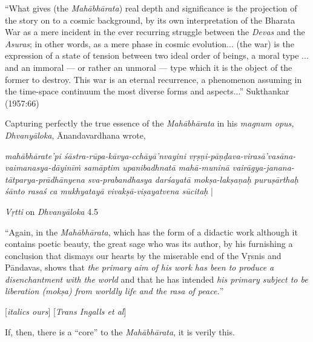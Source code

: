 \begin{myquote}
“What gives (the {\sl Mahābhārata}) real depth and significance is the projection of the story on to a cosmic background, by its own interpretation of the Bharata War as a mere incident in the ever recurring struggle between the {\sl Devas} and the {\sl Asuras}; in other words, as a mere phase in cosmic evolution... (the war) is the expression of a state of tension between two ideal order of beings, a moral type ...  and an immoral --- or rather an unmoral --- type which it is the object of the former to destroy. This war is an eternal recurrence, a phenomenon assuming in the time-space continuum the most diverse forms and aspects...” 
\hfill Sukthankar (1957:66)
\end{myquote}

Capturing perfectly the true essence of the {\sl Mahābhārata} in his {\sl magnum opus, Dhvanyāloka}, Ānandavardhana wrote, 

\begin{myquote}
{{\sl mahābhārate'pi śāstra-rūpa-kāvya-cchāyā’nvayini vṛṣṇi-pāṇḍava-virasā’vasāna-vaimanasya-dāyinīṁ samāptim upanibadhnatā mahā-muninā vairāgya-janana-tātparya-prādhānyena sva-prabandhasya darśayatā mokṣa-lakṣaṇaḥ puruṣārthaḥ śānto rasaś ca mukhyatayā vivakṣā-viṣayatvena sūcitaḥ}} |\relax

\hfill {\sl Vṛtti} on {\sl Dhvanyāloka} 4.5

\smallskip
“Again, in the {\sl Mahābhārata}, which has the form of a didactic work although it contains poetic beauty, the great sage who was its author, by his furnishing a conclusion that dismays our hearts by the miserable end of the Vṛsnis and Pāndavas, shows that {\sl the primary aim of his work has been to produce a disenchantment with the world} and that he has intended {\sl his primary subject to be liberation (mokṣa) from worldly life and the rasa of peace.}”

\hfill[{\sl italics ours}] [{\sl Trans Ingalls et al}]
\end{myquote}

If, then, there is a “core” to the {\sl Mahābhārata}, it is verily this.  

